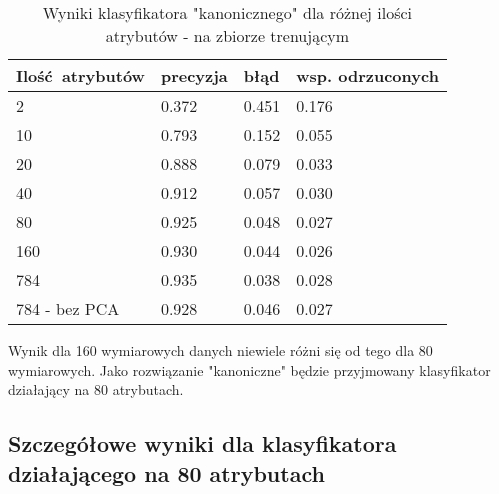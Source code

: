 \documentclass[a4paper]{article}
\begin{document}
\begin{table}[H]
    \caption{Wyniki klasyfikatora "kanonicznego" dla różnej ilości atrybutów - na zbiorze trenującym
    \label{table:attrCountTrain}
    }
\begin{center}
    \begin{tabular}{| l | l | l | l |}
    \hline
        Ilość atrybutów & precyzja & błąd & wsp. odrzuconych \\
    \hline
        2  & 0.372 & 0.451 & 0.176 \\
        10 & 0.793 & 0.152 & 0.055 \\
        20 & 0.888 & 0.079 & 0.033 \\
        40 & 0.912 & 0.057 & 0.030 \\
        80 & 0.925 & 0.048 & 0.027 \\
        160& 0.930 & 0.044 & 0.026 \\
        784& 0.935 & 0.038 & 0.028 \\
        784 - bez PCA & 0.928 & 0.046 & 0.027 \\
    \hline
    \end{tabular}
\end{center}
\end{table}

Wynik dla 160 wymiarowych danych niewiele różni się od tego dla 80 wymiarowych.
Jako rozwiązanie "kanoniczne" będzie przyjmowany klasyfikator działający na 80 atrybutach.

\subsection{Szczegółowe wyniki dla klasyfikatora działającego na 80 atrybutach}
\end{document}
